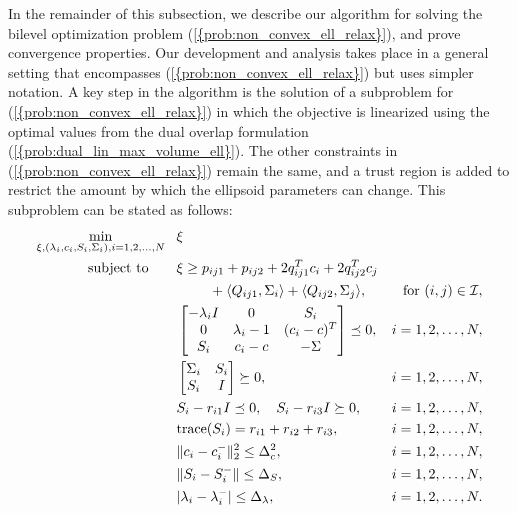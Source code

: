 \documentclass{siamltex}
\providecommand{\norm}[1]{\lVert#1\rVert}
\begin{document}
In the remainder of this subsection, we describe our algorithm for
solving the bilevel optimization problem
{(\ref{{prob:non_convex_ell_relax}})}, and prove convergence
properties. Our development and analysis takes place in a general
setting that encompasses {(\ref{{prob:non_convex_ell_relax}})} but uses
simpler notation. A key step in the algorithm is the solution of a
subproblem for {(\ref{{prob:non_convex_ell_relax}})} in which the
objective is linearized using the optimal values from the dual overlap
formulation {(\ref{{prob:dual_lin_max_volume_ell}})}. The other
constraints in {(\ref{{prob:non_convex_ell_relax}})} remain the same, and
a trust region is added to restrict the amount by which the ellipsoid
parameters can change. This subproblem can be stated as follows:
\begin{subequations}
\label{prob:ellipsoids_upper}
\begin{align}
\label{prob:ellipsoids_upper.1}
\min_{\xi, (\lambda_i, c_i, S_i, \Sigma_i), i=1,2,\dotsc,N} \;\;\;
&\xi\\
\nonumber
\mbox{\rm subject to} \qquad & \xi\geq p_{ij1}+p_{ij2}+2q_{ij1}^Tc_i+2q_{ij2}^Tc_j\nonumber\\ 
\label{prob:ellipsoids_upper.2}
&\qquad\,\,+\langle Q_{ij1},\Sigma_{i}\rangle+\langle Q_{ij2},\Sigma_{j}\rangle, & \mbox{for }  (i, j) \in {\cal I},  \\
\label{prob:ellipsoids_upper.3}
&\left[ \begin{matrix} - \lambda_i I &0&S_i\\
0& \lambda_i-1&(c_i-c)^T\\ 
S_i &c_i-c&-\Sigma \end{matrix} \right] \preceq 0, & i=1,2,\dotsc,N, \\
\label{prob:ellipsoids_upper.3a}
&\left[ \begin{matrix} \Sigma_i & S_i \\ S_i & I \end{matrix} \right] \succeq 0,  & i=1,2,\dotsc,N, \\
\label{prob:ellipsoids_upper.4}
&S_i-r_{i1} I \preceq 0, \quad S_i-r_{i3} I\succeq 0, &  i=1,2,\dots,N,\\
\label{prob:ellipsoids_upper.5}
 &{\mbox{\rm trace}}(S_i)=r_{i1}+r_{i2}+r_{i3}, & i=1,2,\dots,N,\\
\label{prob:ellipsoids_upper.6}
&\norm{c_i-c_i^-}_2^2 \leq \Delta_c^2, &  i=1,2,\dots,N, \\
\label{prob:ellipsoids_upper.7}
&\norm{S_i-S_i^-} \leq \Delta_S, &  i=1,2,\dots,N, \\
\label{prob:ellipsoids_upper.8}
&|\lambda_i-\lambda_i^-| \leq \Delta_{\lambda}, &  i=1,2,\dots,N.
\end{align}
\end{subequations}
\end{document}
